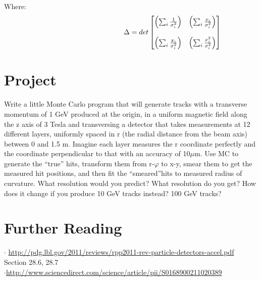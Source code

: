 \noindent
Where: 
\begin{equation*}\hspace{41mm}
\Delta=det\begin{bmatrix}
\left(\sum_{i}\frac{1}{\sigma_{i}^{2}} \right )&\left(\sum_{i}\frac{x_{i}}{\sigma_{i}^{2}} \right)\\ \\
\left(\sum_{i}\frac{x_{i}}{\sigma_{i}^{2}} \right)&\left(\sum_{i}\frac{x_{i}^{2}}{\sigma_{i}^{2}}\right)
\end{bmatrix}
\end{equation*}

\section{Project}
Write a little Monte Carlo program that will generate tracks with a transverse momentum of 1 GeV produced at the origin, in a uniform magnetic field along the z axis of 3 Tesla and transversing a detector that takes measurements at 12 different layers, uniformly spaced in r (the radial distance from the beam axis) between 0 and 1.5 m. Imagine each layer measures the r coordinate perfectly and the coordinate perpendicular to that with an accuracy of 10$\mu$m. Use MC to generate the ``true'' hits, transform them from r-$\varphi$ to x-y, smear them to get the measured hit positions, and then fit the ``smeared''hits to measured radius of curvature. What resolution would you predict?  What resolution do you get?  How does it change if you produce 10 GeV tracks instead? 100 GeV tracks?
\section{Further Reading}
$\cdot$ \url{http://pdg.lbl.gov/2011/reviews/rpp2011-rev-particle-detectors-accel.pdf} Section 28.6, 28.7\\
\noindent
$\cdot$\url{http://www.sciencedirect.com/science/article/pii/S0168900211020389}



















